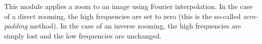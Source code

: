 This module applies a zoom to an image using Fourier interpolation.
In the case of a direct zooming, the high frequencies are set to zero
(this is the so-called {\em zero-padding} method). In the case
of an inverse zooming, the high frequencies are simply lost and the
low frequencies are unchanged.
